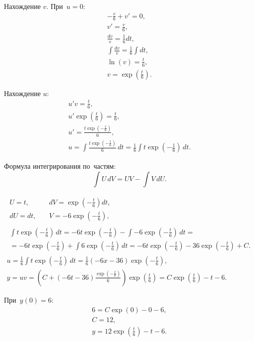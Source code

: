 \documentclass[10pt, a4paper, titlepage, oneside]{article}
\begin{document}
Нахождение $v$. При~$u=0$:
\begin{gather*}
    -\frac{v}{6}+v'=0 ,\\
    v'=\frac{v}{6} ,\\
    \frac{dv}{v}=\frac{1}{6}dt ,\\
    \int\frac{dv}{v}=\frac{1}{6}\int dt ,\\
    \ln(v)=\frac{t}{6} ,\\
    v=\exp\left(\frac{t}{6}\right) .
\end{gather*}

Нахождение $u$:
\begin{gather*}
    u'v=\frac{t}{6} ,\\
    u'\exp\left(\frac{t}{6}\right)=\frac{t}{6} ,\\
    u'=\frac{t\exp\left(-\frac{t}{6}\right)}{6} ,\\
    u=\int\frac{t\exp\left(-\frac{t}{6}\right)}{6}\,dt = \frac{1}{6}\int t\exp\left(-\frac{1}{6}\right)\,dt .
\end{gather*}

Формула интегрирования по~частям:
$$\int U\,dV = UV - \int V \,dU .$$

\begin{gather*}
    \begin{aligned}
        U=t , &\quad dV=\exp\left(-\frac{t}{6}\right)dt ,\\
        dU=dt , &\quad V=-6\exp\left(-\frac{t}{6}\right) ,
    \end{aligned} 
    \\
    \begin{multlined}
        \int t\exp\left(-\frac{t}{6}\right)\,dt=-6t\exp\left(-\frac{t}{6}\right)-\int-6\exp\left(-\frac{t}{6}\right)\,dt = \\
        = -6t\exp\left(-\frac{t}{6}\right)+\int6\exp\left(-\frac{t}{6}\right)\,dt=-6t\exp\left(-\frac{t}{6}\right)-36\exp\left(-\frac{t}{6}\right)+C .
    \end{multlined}
    \\
    u=\frac{1}{6}\int t\exp\left(-\frac{t}{6}\right)\,dt = \frac{1}{6}(-6x-36)\exp\left(-\frac{t}{6}\right) ,\\
    y=uv=\left(C+(-6t-36)\frac{\exp\left(-\frac{t}{6}\right)}{6}\right)\exp\left(\frac{t}{6}\right)=C\exp\left(\frac{t}{6}\right)-t-6 .
\end{gather*}

При~$y(0)=6$:
\begin{gather*}
    6 = C\exp(0)-0-6 ,\\
    C = 12 ,\\
    y = 12\exp\left(\frac{t}{6}\right)-t-6 .
\end{gather*}
\end{document}
